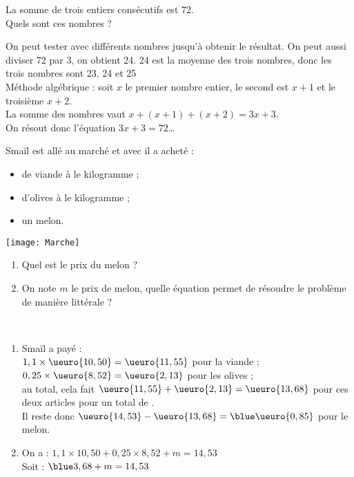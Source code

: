 \begin{colonne*exercice}
\medskip


\begin{exercice} %
   La somme de trois entiers consécutifs est 72. \\
   Quels sont ces nombres ? \\
\end{exercice}

\begin{corrige}
   On peut tester avec différents nombres jusqu'à obtenir le résultat. On peut aussi diviser 72 par 3, on obtient 24. 24 est la moyenne des trois nombres, donc {\blue les trois nombres sont 23, 24 et 25}  \\ [2mm]
   Méthode algébrique : soit $x$ le premier nombre entier, le second est $x+1$ et le troisième $x+2$. \\
   La somme des nombres vaut $x+(x+1)+(x+2) =3x+3$. \\
   On résout donc l'équation $3x+3 =72$\dots
\end{corrige}

\bigskip


\begin{exercice} %
   Smaïl est allé au marché et avec  il a
acheté :
   \begin{itemize}
      \item {} de viande à  le kilogramme ;
      \item {} d'olives à  le kilogramme ;
      \item un melon.
   \end{itemize}
   \begin{center}
      \texttt{[image: Marche]}
   \end{center}
   \begin{enumerate}
      \item Quel est le prix du melon ?
      \item On note $m$ le prix de melon, quelle équation permet de résoudre le problème de manière littérale ?
   \end{enumerate}
\end{exercice}

\begin{corrige}
  \ \\ [-5mm]
   \begin{enumerate}
      \item Smaïl a payé : \\
      $1,1\times\ueuro{10,50}=\ueuro{11,55}$ pour la viande ; \\
      $0,25\times\ueuro{8,52} =\ueuro{2,13}$ pour les olives ; \\
      au total, cela fait $\ueuro{11,55}+\ueuro{2,13} =\ueuro{13,68}$ pour ces deux articles pour un total de . \\
      Il reste donc $\ueuro{14,53}-\ueuro{13,68} =\blue \ueuro{0,85}$ pour le melon.
      \item On a : $1,1\times10,50+0,25\times8,52+m =14,53$ \\
       Soit : $\blue 3,68+m =14,53$
   \end{enumerate}
   

\end{corrige}
\end{colonne*exercice}
